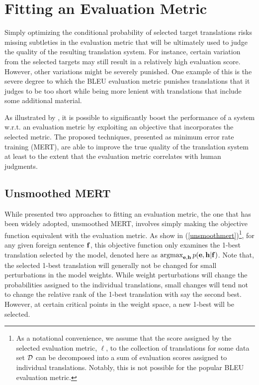 \documentclass[11pt]{article}
\DeclareMathOperator*{\argmax}{argmax}
\begin{document}

\section{Fitting an Evaluation Metric}

Simply optimizing the conditional probability of selected target translations risks missing subtleties in the evaluation metric that will be ultimately used to judge the quality of the resulting translation system. For instance, certain variation from the selected targets may still result in a relatively high evaluation score. However, other variations might be severely punished. One example of this is the severe degree to which the BLEU evaluation metric \cite{kishore2002} punishes translations that it judges to be too short while being more lenient with translations that include some additional material. 

As illustrated by , it is possible to significantly boost the performance of a system w.r.t. an evaluation metric by exploiting an objective that incorporates the selected metric. The proposed techniques, presented as minimum error rate training (MERT), are able to improve the true quality of the translation system at least to the extent that the evaluation metric correlates with human judgments. 

\subsection{Unsmoothed MERT}
While  presented two approaches to fitting an evaluation metric, the one that has been widely adopted, unsmoothed MERT, involves simply making the objective function equivalent with the evaluation metric. As show in (\ref{unsmoothmert})\footnote{As a notational convenience, we assume that the score assigned by the selected evaluation metric, $\ell$, to the collection of translations for some data set ${\cal D}$ can be decomposed into a sum of evaluation scores assigned to individual translations. Notably, this is not possible for the popular BLEU evaluation metric.}, for any given foreign sentence ${\bf f}$, this objective function only examines the 1-best translation selected by the model, denoted here as $\argmax_{{\bf e}, {\bf h}} p({\bf e}, {\bf h} | {\bf f})$. Note that, the selected 1-best translation will generally not be changed for small perturbations in the model weights. While weight perturbations will change the probabilities assigned to the individual translations, small changes will tend not to change the relative rank of the 1-best translation with say the second best. However, at certain critical points in the weight space, a new 1-best will be selected. 
\end{document}
